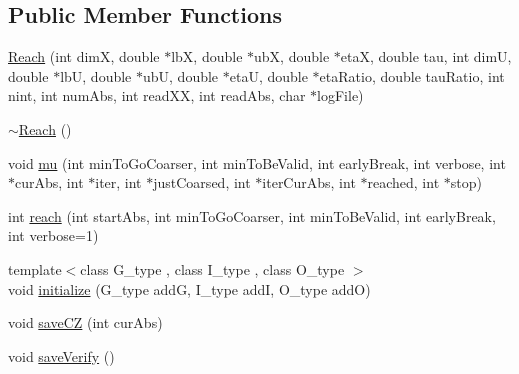 \subsection*{Public Member Functions}
\begin{DoxyCompactItemize}
\item 
\hyperlink{classscots_1_1Reach_ac61b7e746e55013c48de47eb3dc00ff7}{Reach} (int dimX, double $\ast$lbX, double $\ast$ubX, double $\ast$etaX, double tau, int dimU, double $\ast$lbU, double $\ast$ubU, double $\ast$etaU, double $\ast$eta\+Ratio, double tau\+Ratio, int nint, int num\+Abs, int read\+XX, int read\+Abs, char $\ast$log\+File)
\item 
\hyperlink{classscots_1_1Reach_a05425187c9015158f5495904c34342d0}{$\sim$\+Reach} ()
\item 
void \hyperlink{classscots_1_1Reach_a6787ba675345efb35d5b5dcd720cf389}{mu} (int min\+To\+Go\+Coarser, int min\+To\+Be\+Valid, int early\+Break, int verbose, int $\ast$cur\+Abs, int $\ast$iter, int $\ast$just\+Coarsed, int $\ast$iter\+Cur\+Abs, int $\ast$reached, int $\ast$stop)
\item 
int \hyperlink{classscots_1_1Reach_aae2c35919866a8235f822542a4bb3dfe}{reach} (int start\+Abs, int min\+To\+Go\+Coarser, int min\+To\+Be\+Valid, int early\+Break, int verbose=1)
\item 
{\footnotesize template$<$class G\+\_\+type , class I\+\_\+type , class O\+\_\+type $>$ }\\void \hyperlink{classscots_1_1Reach_ab9c383f3cbb0556814479ea377e75baa}{initialize} (G\+\_\+type addG, I\+\_\+type addI, O\+\_\+type addO)
\item 
void \hyperlink{classscots_1_1Reach_ada9bf5083703b737976effb85de28c4b}{save\+CZ} (int cur\+Abs)
\item 
void \hyperlink{classscots_1_1Reach_ab9c39fa2834a0a8f08abe48838ae1c41}{save\+Verify} ()
\end{DoxyCompactItemize}
